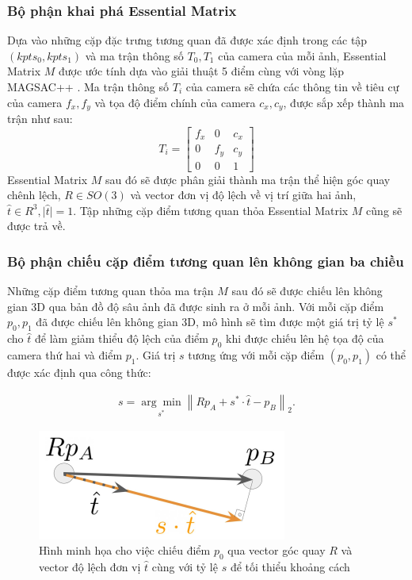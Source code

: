 \subsubsection{Bộ phận khai phá Essential Matrix}

Dựa vào những cặp đặc trưng tương quan đã được xác định trong các tập $(kpts_0, kpts_1)$ và ma trận thông số $T_0, T_1$ của camera của mỗi ảnh, Essential Matrix $M$ được ước tính dựa vào giải thuật 5 điểm \cite{nister2004efficient} cùng với vòng lặp MAGSAC++ \cite{barath2020magsac++}. Ma trận thông số $T_i$ của camera sẽ chứa các thông tin về tiêu cự của camera $f_x,f_y$ và tọa độ điểm chính của camera $c_x,c_y$, được sắp xếp thành ma trận như sau:
$$
  T_i = \begin{bmatrix} f_x & 0 & c_x \\ 0 & f_y & c_y \\ 0 & 0 & 1 \end{bmatrix}
$$
Essential Matrix $M$ sau đó sẽ được phân giải thành ma trận thể hiện góc quay chênh lệch, $R \in SO(3)$ và vector đơn vị độ lệch về vị trí giữa hai ảnh, $\hat{t} \in R^{3}, \lvert \hat{t} \rvert = 1$. Tập những cặp điểm tương quan thỏa Essential Matrix $M$ cũng sẽ được trả về.

\subsubsection{Bộ phận chiếu cặp điểm tương quan lên không gian ba chiều}

Những cặp điểm tương quan thỏa ma trận $M$ sau đó sẽ được chiếu lên không gian 3D qua bản đồ độ sâu ảnh đã được sinh ra ở mỗi ảnh. Với mỗi cặp điểm $p_0, p_1$ đã được chiếu lên không gian 3D, mô hình sẽ tìm được một giá trị tỷ lệ $s^*$ cho $\hat{t}$ để làm giảm thiểu độ lệch của điểm $p_0$ khi được chiếu lên hệ tọa độ của camera thứ hai và điểm $p_1$. Giá trị $s$ tương ứng với mỗi cặp điểm $(p_0, p_1)$ có thể được xác định qua công thức:

$$
  \begin{aligned}
    s=\underset{s^*}{\arg \min }\left\|R p_A+s^* \cdot \hat{t}-p_B\right\|_2 .
  \end{aligned}
$$

\begin{figure}[H]
  \centering
  \includegraphics[scale=1]{pics/Proposal/reprojection.png}
  \caption[Minh họa cho việc xác định tỷ lệ $s$ bằng độ sâu ảnh]{Hình minh họa cho việc chiếu điểm $p_0$ qua vector góc quay $R$ và vector độ lệch đơn vị $\hat{t}$ cùng với tỷ lệ $s$ để tối thiểu khoảng cách \cite{arnold2022mapfree}}
\end{figure}

